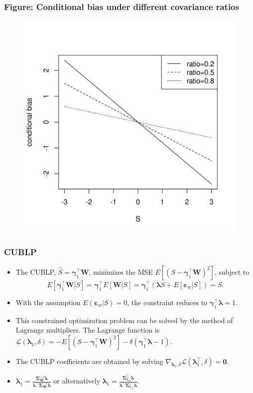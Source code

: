 \documentclass{beamer}
\newcommand{\mbf}[1]{\bm{#1}}
\newcommand{\bgamma}{\mbf{\gamma}}
\newcommand{\blambda}{\mbf{\lambda}}
\newcommand{\bW}{\mbf{W}}
\newcommand{\bsigma}{\mbf{\Sigma}}
\begin{document}
	\begin{frame}[t]\frametitle{Figure: Conditional bias under different
	covariance ratios}
		\begin{figure}[t]
	  \centering
	    \includegraphics[scale = 0.6]{Fig/conditional_bias.png}
	  \end{figure}
	\end{frame}

	\begin{frame}[t]\frametitle{CUBLP}
		\begin{itemize}
			\item The CUBLP, $\hat{S} = \bgamma_1^\top \bW$, minimizes the MSE $E[(S -
			\bgamma_1^\top \bW )^2]$, subject to
			\begin{equation}
				E[\bgamma_1^\top\bW|S] = \bgamma_1^\top E[\bW|S] = \bgamma_1^\top 
				(\blambda S + E[\mbf{\varepsilon}_w|S]) = S.
			\end{equation}
			\item With the assumption $E(\mbf{\varepsilon}_w|S) = 0$, the constraint
			reduces to $\bgamma_1^\top \blambda = 1$.
			\item This constrained optimization problem can be solved by the method of
			Lagrange multipliers. The Lagrange function is $\mathcal{L} (\blambda_1,
			\delta) = -E[(S-\bgamma_1^\top \bW)^2] - \delta(\bgamma_1^\top \blambda -
			1)$.
			\item The CUBLP coefficients are obtained by solving $\nabla_{\blambda_1,
			\delta} \mathcal{L}(\blambda_1^\top, \delta) = \mbf{0}$.
			\item $\blambda_1 = \frac{\bsigma_{\bW}^{-1}\blambda}{\blambda^\top
			\bsigma_{\bW}^{-1}\blambda}$ or alternatively $\blambda_1 = \frac{\bsigma_
			{\mbf{\varepsilon}_w}^\top \blambda}{\blambda^\top \bsigma_{\mbf{\varepsilon}_w}^\top
			\blambda}$.
		\end{itemize}
	\end{frame}
\end{document}

